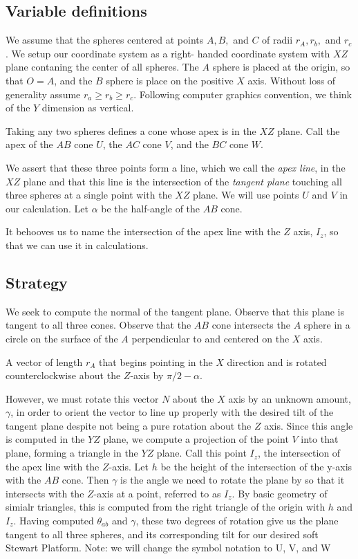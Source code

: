\documentclass{article}
\begin{document}
\subsection{Variable definitions}

We assume that the spheres centered at points $A,B,$ and $C$
of radii $r_A,r_b,$ and $r_c$. We setup our coordinate system as a right-
handed coordinate system with $XZ$ plane contaning the center of all spheres.
The $A$ sphere is placed at the origin, so that $O = A$, and the $B$ sphere
is place on the positive $X$ axis. Without loss of generality assume $r_a \geq r_b \geq r_c$.
Following computer graphics convention, we think of the $Y$ dimension as vertical.

Taking any two spheres defines a cone whose apex is in the $XZ$ plane.
Call the apex of the $AB$ cone $U$, the $AC$ cone $V$, and the $BC$ cone $W$.

We assert that these three points form a line, which we call the {\em apex line}, in the $XZ$ plane and that this
line is the intersection of the {\em tangent plane} touching all three spheres at a single point
with the $XZ$ plane. We will use points $U$ and $V$ in our calculation.
Let $\alpha$ be the half-angle of the $AB$ cone.

It behooves us to name the intersection of the apex line with the $Z$ axis, $I_z$, so
that we can use it in calculations.

\subsection{Strategy}

We seek to compute the normal of the tangent plane.
Observe that this plane is tangent to all three cones.
Observe that the $AB$ cone intersects
the $A$ sphere in a circle on the surface of the $A$ perpendicular to and centered on the $X$ axis.

A vector of length $r_A$ that begins pointing in the $X$ direction and is rotated counterclockwise
about the $Z$-axis by $\pi/2 - \alpha$.

However, we must rotate this vector $N$ about the $X$ axis by an unknown amount, $\gamma$, in order
to orient the vector to line up properly with the desired tilt of the tangent plane despite not being a pure rotation about the $Z$ axis. Since this angle is computed in the $YZ$ plane, we compute a projection of the point $V$ into
that plane, forming a triangle in the $YZ$ plane.  Call this point $I_z$, the intersection
of the apex line with the $Z$-axis. Let $h$ be the height of the intersection of the y-axis with the $AB$ cone.
Then $\gamma$ is the angle we need to rotate the plane by so that it intersects with the $Z$-axis at a point, referred to as $I_z$. By basic geometry of simialr triangles, this is computed from the right triangle of the origin with $h$ and $I_z$.
Having computed $\theta_{ab}$ and $\gamma$, these two degrees of rotation give us the plane tangent to all three spheres, and its corresponding tilt for our desired soft Stewart Platform.
Note: we will change the symbol notation to U, V, and W
\end{document}
